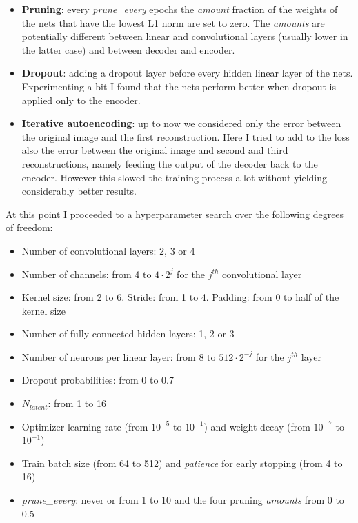 \documentclass[a4paper, 11pt]{article}
\begin{document}
    \begin{itemize}
      \item \textbf{Pruning}: every \emph{prune\_every} epochs the \emph{amount} fraction of the weights of the nets that have the lowest L1 norm are set to zero. The \emph{amounts} are potentially different between linear and convolutional layers (usually lower in the latter case) and between decoder and encoder.
      \item \textbf{Dropout}: adding a dropout layer before every hidden linear layer of the nets. Experimenting a bit I found that the nets perform better when dropout is applied only to the encoder.
      \item \textbf{Iterative autoencoding}: up to now we considered only the error between the original image and the first reconstruction. Here I tried to add to the loss also the error between the original image and second and third reconstructions, namely feeding the output of the decoder back to the encoder. However this slowed the training process a lot without yielding considerably better results.
    \end{itemize}

    At this point I proceeded to a hyperparameter search over the following degrees of freedom:
    \begin{itemize}
      \item Number of convolutional layers: 2, 3 or 4
      \item Number of channels: from 4 to $4\cdot2^j$ for the $j^{th}$ convolutional layer
      \item Kernel size: from 2 to 6. Stride: from 1 to 4. Padding: from 0 to half of the kernel size
      \item Number of fully connected hidden layers: 1, 2 or 3
      \item Number of neurons per linear layer: from 8 to $512\cdot2^{-j}$ for the $j^{th}$ layer
      \item Dropout probabilities: from 0 to 0.7
      \item $N_{latent}$: from 1 to 16
      \item Optimizer learning rate (from $10^{-5}$ to $10^{-1}$) and weight decay (from $10^{-7}$ to $10^{-1}$)
      \item Train batch size (from 64 to 512) and \emph{patience} for early stopping (from 4 to 16)
      \item \emph{prune\_every}: never or from 1 to 10 and the four pruning \emph{amounts} from 0 to 0.5
    \end{itemize}
\end{document}
